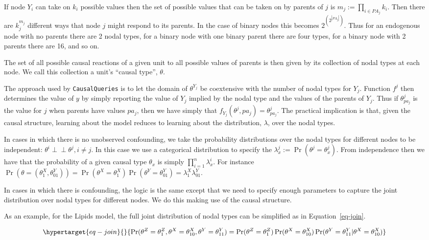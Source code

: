 \documentclass[
  11pt,
  article]{jss}
\begin{document}
If node \(Y_i\) can take on \(k_i\) possible values then the set of
possible values that can be taken on by parents of \(j\) is
\(m_j :=\prod_{i\in PA_j}k_i\). Then there are \(k_j^{m_j}\) different
ways that node \(j\) might respond to its parents. In the case of binary
nodes this becomes \(2^{\left(2^{|PA_j|}\right)}\). Thus for an
endogenous node with no parents there are 2 nodal types, for a binary
node with one binary parent there are four types, for a binary node with
2 parents there are 16, and so on.

The set of all possible causal reactions of a given unit to all possible
values of parents is then given by its collection of nodal types at each
node. We call this collection a unit's ``causal type'', \(\theta\).

The approach used by \texttt{CausalQueries} is to let the domain of
\(\theta^{Y_j}\) be coextensive with the number of nodal types for
\(Y_j\). Function \(f^j\) then determines the value of \(y\) by simply
reporting the value of \(Y_j\) implied by the nodal type and the values
of the parents of \(Y_j\). Thus if \(\theta^j_{pa_j}\) is the value for
\(j\) when parents have values \(pa_j\), then we have simply that
\(f_{Y_j}(\theta^{j}, pa_j) = \theta^j_{pa_j}\). The practical
implication is that, given the causal structure, learning about the
model reduces to learning about the distribution, \(\lambda\), over the
nodal types.

In cases in which there is no unobserved confounding, we take the
probability distributions over the nodal types for different nodes to be
independent: \(\theta^i \perp\!\!\! \perp \theta^j, i\neq j\). In this
case we use a categorical distribution to specify the
\({\lambda^j_x} := \Pr(\theta^j = {\theta^j_x})\). From independence
then we have that the probability of a given causal type \(\theta_x\) is
simply \(\prod_{i=1}^n {\lambda^i_x}\). For instance
\(\Pr(\theta = (\theta^X_1, \theta^Y_{01})) = \Pr(\theta^X = \theta^X_1)\Pr(\theta^Y = \theta^Y_{01}) = \lambda^X_1\lambda^Y_{01}\).

In cases in which there is confounding, the logic is the same except
that we need to specify enough parameters to capture the joint
distribution over nodal types for different nodes. We do this making use
of the causal structure.

As an example, for the Lipids model, the full joint distribution of
nodal types can be simplified as in Equation~\ref{eq-join}.

\begin{equation}\protect\hypertarget{eq-join}{}{
\Pr(\theta^Z = \theta^Z_1, \theta^X = \theta^X_{10}, \theta^Y = \theta^Y_{11}) = 
\Pr(\theta^Z = \theta^Z_1)\Pr(\theta^X = \theta^X_{10})\Pr(\theta^Y = \theta^Y_{11}|\theta^X = \theta^X_{10})
}\label{eq-join}\end{equation}
\end{document}
